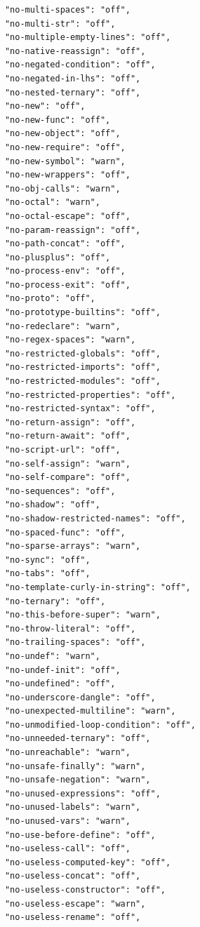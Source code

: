 \begin{figure}[h!]
\begin{small}
\begin{verbatim}
            "no-multi-spaces": "off",
            "no-multi-str": "off",
            "no-multiple-empty-lines": "off",
            "no-native-reassign": "off",
            "no-negated-condition": "off",
            "no-negated-in-lhs": "off",
            "no-nested-ternary": "off",
            "no-new": "off",
            "no-new-func": "off",
            "no-new-object": "off",
            "no-new-require": "off",
            "no-new-symbol": "warn",
            "no-new-wrappers": "off",
            "no-obj-calls": "warn",
            "no-octal": "warn",
            "no-octal-escape": "off",
            "no-param-reassign": "off",
            "no-path-concat": "off",
            "no-plusplus": "off",
            "no-process-env": "off",
            "no-process-exit": "off",
            "no-proto": "off",
            "no-prototype-builtins": "off",
            "no-redeclare": "warn",
            "no-regex-spaces": "warn",
            "no-restricted-globals": "off",
            "no-restricted-imports": "off",
            "no-restricted-modules": "off",
            "no-restricted-properties": "off",
            "no-restricted-syntax": "off",
            "no-return-assign": "off",
            "no-return-await": "off",
            "no-script-url": "off",
            "no-self-assign": "warn",
            "no-self-compare": "off",
            "no-sequences": "off",
            "no-shadow": "off",
            "no-shadow-restricted-names": "off",
            "no-spaced-func": "off",
            "no-sparse-arrays": "warn",
            "no-sync": "off",
            "no-tabs": "off",
            "no-template-curly-in-string": "off",
            "no-ternary": "off",
            "no-this-before-super": "warn",
            "no-throw-literal": "off",
            "no-trailing-spaces": "off",
            "no-undef": "warn",
            "no-undef-init": "off",
            "no-undefined": "off",
            "no-underscore-dangle": "off",
            "no-unexpected-multiline": "warn",
            "no-unmodified-loop-condition": "off",
            "no-unneeded-ternary": "off",
            "no-unreachable": "warn",
            "no-unsafe-finally": "warn",
            "no-unsafe-negation": "warn",
            "no-unused-expressions": "off",
            "no-unused-labels": "warn",
            "no-unused-vars": "warn",
            "no-use-before-define": "off",
            "no-useless-call": "off",
            "no-useless-computed-key": "off",
            "no-useless-concat": "off",
            "no-useless-constructor": "off",
            "no-useless-escape": "warn",
            "no-useless-rename": "off",

\end{verbatim}
\end{small}
\end{figure}
